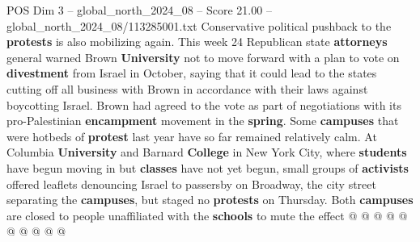 \begin{textsample}{POS Dim 3 – global\_north\_2024\_08 – Score 21.00 – global\_north\_2024\_08/113285001.txt}
Conservative political pushback to the \textbf{protests} is also mobilizing again.
This week 24 Republican state \textbf{attorneys} general warned Brown \textbf{University} not to move forward with a plan to vote on \textbf{divestment} from Israel in October, saying that it could lead to the states cutting off all business with Brown in accordance with their laws against boycotting Israel.
Brown had agreed to the vote as part of negotiations with its pro-Palestinian \textbf{encampment} movement in the \textbf{spring}.
Some \textbf{campuses} that were hotbeds of \textbf{protest} last year have so far remained relatively calm.
At Columbia \textbf{University} and Barnard \textbf{College} in New York City, where \textbf{students} have begun moving in but \textbf{classes} have not yet begun, small groups of \textbf{activists} offered leaflets denouncing Israel to passersby on Broadway, the city street separating the \textbf{campuses}, but staged no \textbf{protests} on Thursday.
Both \textbf{campuses} are closed to people unaffiliated with the \textbf{schools} to mute the effect @ @ @ @ @ @ @ @ @ @

\end{textsample}
